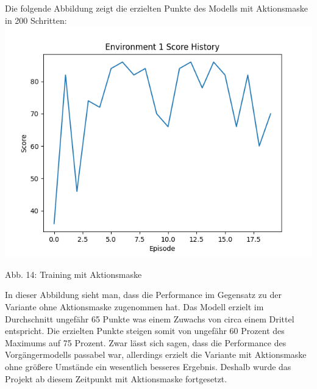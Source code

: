 \begin{minipage}{\linewidth}
	Die folgende Abbildung zeigt die erzielten Punkte des Modells mit Aktionsmaske in 200 Schritten:
	\vspace{0.5cm}
	\includegraphics[width=1\textwidth]{Bilder/trainingwithactionmask}
	
	Abb. 14: Training mit Aktionsmaske\\
\end{minipage}

In dieser Abbildung sieht man, dass die Performance im Gegensatz zu der Variante ohne Aktionsmaske zugenommen hat. Das Modell erzielt im Durchschnitt ungefähr 65 Punkte was einem Zuwachs von circa einem Drittel entspricht. Die erzielten Punkte steigen somit von ungefähr 60 Prozent des Maximums auf 75 Prozent. Zwar lässt sich sagen, dass die Performance des Vorgängermodells passabel war, allerdings erzielt die Variante mit Aktionsmaske ohne größere Umstände ein wesentlich besseres Ergebnis. Deshalb wurde das Projekt ab diesem Zeitpunkt mit Aktionsmaske fortgesetzt.
